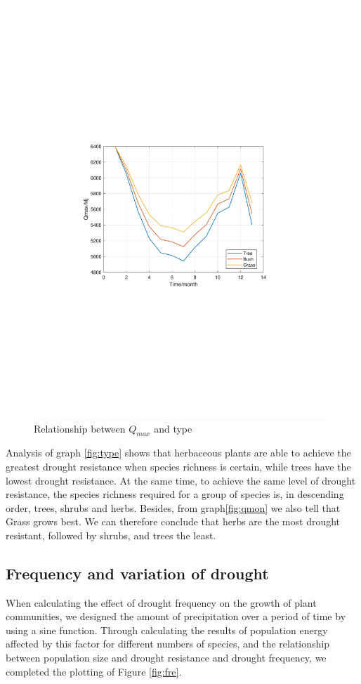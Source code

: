 \documentclass[12pt]{article}  %
\begin{document}
\begin{figure}[htbp]
\begin{minipage}[t]{0.45\textwidth}
		\includegraphics[width=0.98\textwidth]{easymcm/img/Qmax-month.pdf}
		\caption{Relationship between $Q_{max}$ and type}\label{fig:qmon}
	\end{minipage}
\end{figure}

Analysis of graph \eqref{fig:type} shows that herbaceous plants are able to achieve the greatest drought resistance when species richness is certain, while trees have the lowest drought resistance. At the same time, to achieve the same level of drought resistance, the species richness required for a group of species is, in descending order, trees, shrubs and herbs. Besides, from graph\eqref{fig:qmon} we also tell that Grass grows best. We can therefore conclude that herbs are the most drought resistant, followed by shrubs, and trees the least.
\vspace{-0.5cm}
\subsection{Frequency and variation of drought}
\vspace{-0.3cm}
When calculating the effect of drought frequency on the growth of plant communities, we designed the amount of precipitation over a period of time by using a sine function. Through calculating the results of population energy affected by this factor for different numbers of species, and the relationship between population size and drought resistance and drought frequency, we completed the plotting of Figure \eqref{fig:fre}.
\end{document}
